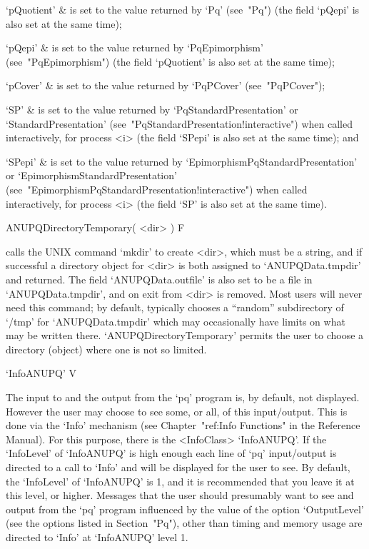 \quad`pQuotient' & is set to the value returned by `Pq'  (see~"Pq")  (the
field `pQepi' is also set at the same time);

\quad`pQepi'  &  is  set  to  the  value  returned   by   `PqEpimorphism'
(see~"PqEpimorphism") (the field `pQuotient' is  also  set  at  the  same
time);

\quad`pCover'  &  is  set   to   the   value   returned   by   `PqPCover'
(see~"PqPCover");

\quad`SP' & is set to the value returned by  `PqStandardPresentation'  or
`StandardPresentation'  (see~"PqStandardPresentation!interactive")   when
called interactively, for process <i> (the field `SPepi' is also  set  at
the same time); and

\quad`SPepi'    &    is    set    to    the     value     returned     by
`EpimorphismPqStandardPresentation' or  `EpimorphismStandardPresentation'
(see~"EpimorphismPqStandardPresentation!interactive")     when     called
interactively, for process <i> (the field `SP' is also set  at  the  same
time).

\enditems

\>ANUPQDirectoryTemporary( <dir> ) F

calls the UNIX command `mkdir' to create <dir>, which must be  a  string,
and if successful a directory  object  for  <dir>  is  both  assigned  to
`ANUPQData.tmpdir' and returned. The field  `ANUPQData.outfile'  is  also
set to be a file in `ANUPQData.tmpdir', and on exit from {\GAP} <dir>  is
removed. Most users will never need  this  command;  by  default,  {\GAP}
typically   chooses   a   ``random''   subdirectory   of    `/tmp'    for
`ANUPQData.tmpdir' which may occasionally have  limits  on  what  may  be
written there. `ANUPQDirectoryTemporary' permits the  user  to  choose  a
directory (object) where one is not so limited.


\>`InfoANUPQ' V

The input to and the output from the `pq' program  is,  by  default,  not
displayed. However the user may choose to  see  some,  or  all,  of  this
input/output.   This   is   done   via   the   `Info'   mechanism    (see
Chapter~"ref:Info Functions" in the {\GAP} Reference  Manual).  For  this
purpose, there is the <InfoClass>  `InfoANUPQ'.  If  the  `InfoLevel'  of
`InfoANUPQ' is high enough each line of `pq' input/output is directed  to
a call to `Info' and will be displayed for the user to see.  By  default,
the `InfoLevel' of `InfoANUPQ' is 1, and it is recommended that you leave
it at this level, or higher. Messages that  the  user  should  presumably
want to see and output from the `pq' program influenced by the  value  of
the option `OutputLevel' (see the options listed in Section~"Pq"),  other
than timing and memory usage are directed to `Info' at `InfoANUPQ'  level
1.

